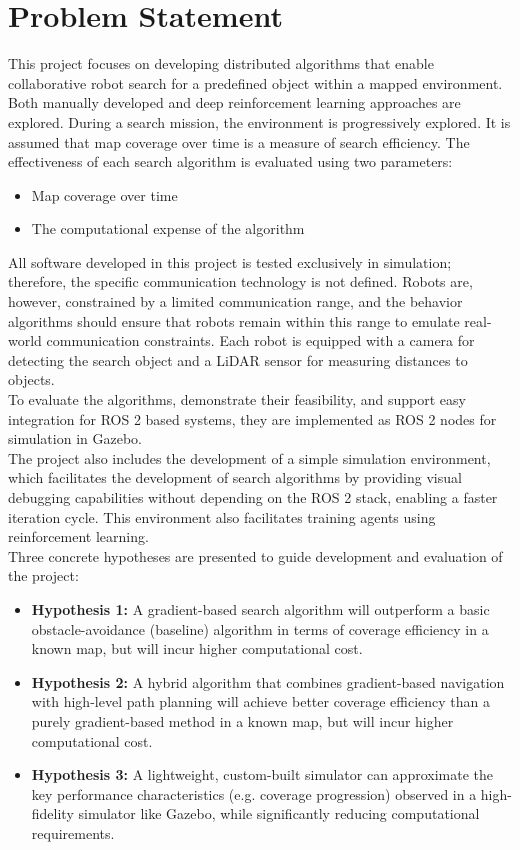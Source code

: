 \section{Problem Statement}
\label{sec:problem-statement}

This project focuses on developing distributed algorithms that enable collaborative robot search for a predefined object within a mapped environment. Both manually developed and deep reinforcement learning approaches are explored. During a search mission, the environment is progressively explored. It is assumed that map coverage over time is a measure of search efficiency. The effectiveness of each search algorithm is evaluated using two parameters:

\begin{itemize}
    \item Map coverage over time
    \item The computational expense of the algorithm
\end{itemize}

All software developed in this project is tested exclusively in simulation; therefore, the specific communication technology is not defined. Robots are, however, constrained by a limited communication range, and the behavior algorithms should ensure that robots remain within this range to emulate real-world communication constraints. Each robot is equipped with a camera for detecting the search object and a LiDAR sensor for measuring distances to objects. \\

To evaluate the algorithms, demonstrate their feasibility, and support easy integration for ROS 2 based systems, they are implemented as ROS 2 nodes for simulation in Gazebo. \\

The project also includes the development of a simple simulation environment, which facilitates the development of search algorithms by providing visual debugging capabilities without depending on the ROS 2 stack, enabling a faster iteration cycle. This environment also facilitates training agents using reinforcement learning. \\

Three concrete hypotheses are presented to guide development and evaluation of the project:

\begin{itemize}
    \item \textbf{Hypothesis 1:} A gradient-based search algorithm will outperform a basic obstacle-avoidance (baseline) algorithm in terms of coverage efficiency in a known map, but will incur higher computational cost.
    \item \textbf{Hypothesis 2:} A hybrid algorithm that combines gradient-based navigation with high-level path planning will achieve better coverage efficiency than a purely gradient-based method in a known map, but will incur higher computational cost.
    \item \textbf{Hypothesis 3:} A lightweight, custom-built simulator can approximate the key performance characteristics (e.g. coverage progression) observed in a high-fidelity simulator like Gazebo, while significantly reducing computational requirements.
\end{itemize}

